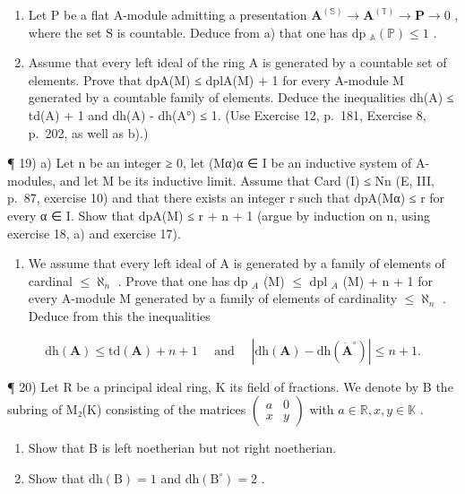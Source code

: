 \begin{enumerate}
\def\labelenumi{\alph{enumi})}
\setcounter{enumi}{1}
\item
  Let P be a flat A-module admitting a presentation \(\mathbf{A}^{(\mathbb{S})}\to\mathbf{A}^{(\mathbb{T})}\to\mathbf{P}\to0\) , where the set S is countable. Deduce from a) that one has dp \(_{\mathbb{A}}(\mathbb{P})\leqslant1\) .
\item
  Assume that every left ideal of the ring A is generated by a countable set of elements. Prove that dpA(M) ≤ dplA(M) + 1 for every A-module M generated by a countable family of elements. Deduce the inequalities dh(A) ≤ td(A) + 1 and \textbar dh(A) - dh(A°)\textbar{} ≤ 1. (Use Exercise 12, p.~181, Exercise 8, p.~202, as well as b).)
\end{enumerate}

¶ 19) a) Let n be an integer ≥ 0, let (Mα)α ∈ I be an inductive system of A-modules, and let M be its inductive limit. Assume that Card (I) ≤ Nn (E, III, p.~87, exercise 10) and that there exists an integer r such that dpA(Mα) ≤ r for every α ∈ I. Show that dpA(M) ≤ r + n + 1 (argue by induction on n, using exercise 18, a) and exercise 17).

\begin{enumerate}
\def\labelenumi{\alph{enumi})}
\setcounter{enumi}{1}
\tightlist
\item
  We assume that every left ideal of A is generated by a family of elements of cardinal \(\leqslant \aleph_{n}\) . Prove that one has dp \(_{A}\) (M) \(\leqslant\) dpl \(_{A}\) (M) + n + 1 for every A-module M generated by a family of elements of cardinality \(\leqslant \aleph_{n}\) . Deduce from this the inequalities
\end{enumerate}

\[
\mathrm{dh} (\mathbf {A}) \leqslant \mathrm{td} (\mathbf {A}) + n + 1 \quad \text { and } \quad | \mathrm{dh} (\mathbf {A}) - \mathrm{dh} (\dot {\mathbf {A}} ^ {\circ}) | \leqslant n + 1.
\]

¶ 20) Let R be a principal ideal ring, K its field of fractions. We denote by B the subring of M₂(K) consisting of the matrices \(\begin{pmatrix} a & 0 \\ x & y \end{pmatrix}\) with \(a \in \mathbb{R}, x, y \in \mathbb{K}\) .

\begin{enumerate}
\def\labelenumi{\alph{enumi})}
\item
  Show that B is left noetherian but not right noetherian.
\item
  Show that \(\mathrm{dh(B)} = 1\) and \(\mathrm{dh(B^{\circ})} = 2\) .
\end{enumerate}

